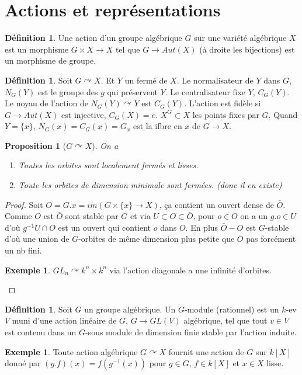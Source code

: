\documentclass[a4paper,12pt]{book}
\theoremstyle{plain}
\newtheorem{prop}[subsection]{Proposition}
\theoremstyle{definition}
\newtheorem{defn}[subsection]{Définition}
\newtheorem{ex}[subsection]{Exemple}
\theoremstyle{remark}
\begin{document}
\section{Actions et représentations}
\begin{defn}
  Une action d'un groupe algébrique $G$ sur une variété algébrique
  $X$ est un morphisme $G\times X\to X$ tel que $G\to Aut(X)$
  (à droite les bijections) est un morphisme de groupe.
\end{defn}
\begin{defn}
  Soit $G\curvearrowright X$. Et $Y$ un fermé de $X$. Le 
  normalisateur de $Y$ dans $G$, $N_G(Y)$ est le groupe
  des $g$ qui préservent $Y$. Le centralisateur fixe $Y$, $C_G(Y)$.
  Le noyau de l'action de $N_G(Y)\curvearrowright Y$ est $C_G(Y)$.
  L'action est fidèle si $G\to Aut(X)$ est injective, $C_G(X)=e$.
  $X^G\subset X$ les points fixes par $G$. Quand $Y=\{x\}$,
  $N_G(x)=C_G(x)=G_x$ est la ifbre en $x$ de $G\to X$.
\end{defn}
\begin{prop}[$G\curvearrowright X$]
  On a 
  \begin{enumerate}
    \item Toutes les orbites sont localement fermés et lisses.
    \item Toute les orbites de dimension minimale sont fermées.
      (donc il en existe)
  \end{enumerate}
\end{prop}
\begin{proof}
  Soit $O=G.x=im(G\times\{x\}\to X)$, ça contient un ouvert dense
  de $\bar O$. Comme $O$ est $\bar O$ sont stable par $G$ et
  via $U\subset O\subset \bar O$, pour $o\in O$ on a un $g.o\in U$
  d'où $g^{-1}U\cap O$ est un ouvert qui contient $o$ dans $O$.
  En plus $\bar O- O$ est $G$-stable d'où une union de $G$-orbites
  de même dimension plus petite que $\bar O$ pas forcément un nb
  fini.
  \begin{ex}
    $GL_n\curvearrowright k^n\times k^n$ via l'action diagonale
    a une infinité d'orbites.
  \end{ex}
\end{proof}
\begin{defn}
  Soit $G$ un groupe algébrique. Un $G$-module (rationnel) est un
  $k$-ev $V$ muni d'une action linéaire de $G$, $G\to GL(V)$
  algébrique, tel que tout $v\in V$ est contenu dans un $G$-sous
  module de dimension finie stable par l'action induite.
\end{defn}
\begin{ex}
  Toute action algébrique $G\curvearrowright X$ fournit une
  action de $G$ sur $k[X]$ donné par $(g.f)(x)=f(g^{-1}(x))$
  pour $g\in G$, $f\in k[X]$ et $x\in X$ lisse.
\end{ex}
\end{document}

